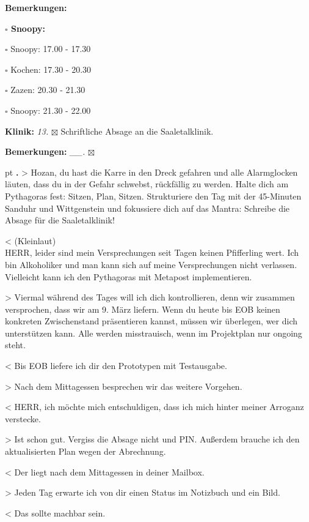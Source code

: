 \documentclass[10pt,a4paper]{article}
\newcounter{notec}
\newcommand\notep[1]{%
  \stepcounter{notec}
  \vskip #1pt
  {\bf\arabic{notec}.}
}
\newcommand\prop[1] {{\color {alizarin} {\bf #1}}}             %
\newcommand\opti[1] {{\color {amethyst} {\bf #1}}}             %
\newcommand\mand[1] {{\color {burntorange} {\bf #1}}}          %
\newcommand\bottomspace{\vskip 4pt}
\newcommand\n[1] { {\sl #1.} \hskip 5pt }
\begin{document}
\begin{mdframed}[style=daystyle]
\begin{labeling}{{\mand {Bemerkungen:}}}
\begin{minipage}{0.75\textwidth}
\begin{labeling}{\prop {$\square$ {Snoopy:}}}
      \item[$\square$ Snoopy:] 17.00 - 17.30
      \item[$\square$ Kochen:] 17.30 - 20.30
        
      \item[$\square$ Zazen:]  20.30 - 21.30
      \item[$\square$ Snoopy:] 21.30 - 22.00
      \end{labeling}
    \end{minipage}
    \bottomspace
  \item[{\opti {Klinik:}}]         \n{13} $\boxtimes$ Schriftliche Absage an die Saaletalklinik.
  \item[{\mand {Bemerkungen:}}]  \n{\_\_} $\boxtimes$
  \end{labeling}
    
  \setcounter{notec}{0}
  
  \notep 0 > Hozan, du hast die Karre in den Dreck gefahren und alle
  Alarmglocken läuten, dass du in der Gefahr schwebst, rückfällig zu werden.
  Halte dich am Pythagoras fest: Sitzen, Plan, Sitzen. Strukturiere den Tag mit
  der 45-Minuten Sanduhr und Wittgenstein und fokussiere dich auf das Mantra:
  Schreibe die Absage für die Saaletalklinik!

  \vskip 2pt
  < (Kleinlaut) \\
  HERR, leider sind mein Versprechungen seit Tagen keinen Pfifferling wert. Ich
  bin Alkoholiker und man kann sich auf meine Versprechungen nicht verlassen.
  Vielleicht kann ich den Pythagoras mit Metapost implementieren.

  \vskip 2pt
  > Viermal während des Tages will ich dich kontrollieren, denn wir zusammen
  versprochen, dass wir am 9. März liefern. Wenn du heute bis EOB keinen
  konkreten Zwischenstand präsentieren kannst, müssen wir überlegen, wer dich
  unterstützen kann. Alle werden misstrauisch, wenn im Projektplan nur ongoing
  steht.

  \vskip 2pt
  < Bis EOB liefere ich dir den Prototypen mit Testausgabe.

  \vskip 2pt
  > Nach dem Mittagessen besprechen wir das weitere Vorgehen.

  \vskip 2pt
  < HERR, ich möchte mich entschuldigen, dass ich mich hinter meiner Arroganz
  verstecke.

  \vskip 2pt
  > Ist schon gut. Vergiss die Absage nicht und PIN. Außerdem brauche ich den
  aktualisierten Plan wegen der Abrechnung.

  \vskip 2pt
  < Der liegt nach dem Mittagessen in deiner Mailbox.

  \vskip 2pt
  > Jeden Tag erwarte ich von dir einen Status im Notizbuch und ein Bild.

  \vskip 2pt
  < Das sollte machbar sein.

\end{mdframed}
\end{document}
